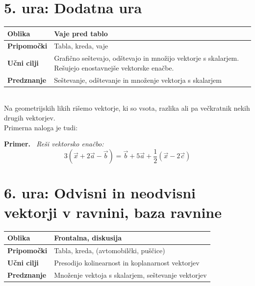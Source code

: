 \documentclass[a4paper,11pt]{article}
\newenvironment{primer}{%
  \par\medskip\noindent\textbf{Primer.}\itshape\ }{\par\medskip}
\begin{document}
\newpage
\section{5. ura: Dodatna ura}
\begin{tabularx}{\textwidth}{|>{\bfseries\RaggedRight}p{2.7cm}|X|}
\hline
Oblika & Vaje pred tablo \\ \hline
Pripomočki & Tabla, kreda, vaje \\ \hline
Učni cilji & Grafično seštevajo, odštevajo in množijo vektorje s skalarjem. Rešujejo enostavnejše vektorske enačbe. \\ \hline
Predznanje & Seštevanje, odštevanje in množenje vektorja s skalarjem \\ \hline

\end{tabularx}
\\

Na geometrijskih likih rišemo vektorje, ki so vsota, razlika ali pa večkratnik nekih drugih vektorjev.\\

Primerna naloga je tudi:
\begin{primer}
    Reši vektorsko enačbo: $$3(\vec{x}+2\vec{a}-\vec{b})=\vec{b}+5\vec{a}+\frac{1}{2}(\vec{x}-2\vec{c})$$
\end{primer}
\newpage \section{6. ura: Odvisni in neodvisni vektorji v ravnini, baza ravnine}
\begin{tabularx}{\textwidth}{|>{\bfseries\RaggedRight}p{2.7cm}|X|}
\hline
Oblika & Frontalna, diskusija \\ \hline
Pripomočki & Tabla, kreda, (avtomobilčki, puščice) \\ \hline
Učni cilji & Presodijo kolinearnost in koplanarnost vektorjev \\ \hline
Predznanje & Množenje vektoja s skalarjem, seštevanje vektorjev \\ \hline

\end{tabularx}
\\
\end{document}
